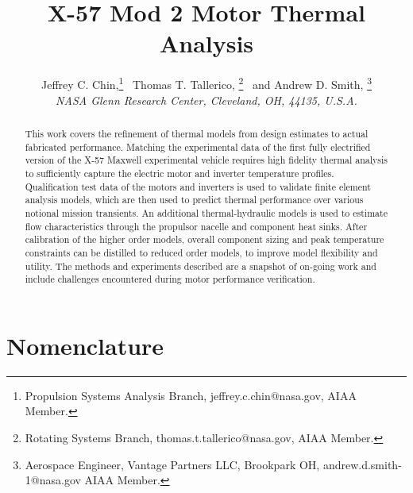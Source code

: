 \documentclass[]{aiaa-tc}%
\title{X-57 Mod 2 Motor Thermal Analysis}
\author{
  Jeffrey C. Chin,\thanks{Propulsion Systems Analysis Branch, jeffrey.c.chin@nasa.gov, AIAA Member.} \
  Thomas T. Tallerico, \thanks{Rotating Systems Branch, thomas.t.tallerico@nasa.gov, AIAA Member.} \
  and Andrew D. Smith, \thanks{Aerospace Engineer, Vantage Partners LLC, Brookpark OH, andrew.d.smith-1@nasa.gov AIAA Member.} \\
  {\normalsize \itshape NASA Glenn Research Center, Cleveland, OH, 44135, U.S.A.} }
\begin{document}
\maketitle

\begin{abstract}

This work covers the refinement of thermal models from design estimates to actual fabricated performance. Matching the experimental data of the first fully electrified version of the X-57 Maxwell experimental vehicle requires high fidelity thermal analysis to sufficiently capture the electric motor and inverter temperature profiles. Qualification test data of the motors and inverters is used to validate finite element analysis models, which are then used to predict thermal performance over various notional mission transients. An additional thermal-hydraulic models is used to estimate flow characteristics through the propulsor nacelle and component heat sinks. After calibration of the higher order models, overall component sizing and peak temperature constraints can be distilled to reduced order models, to improve model flexibility and utility. The methods and experiments described are a snapshot of on-going work and include challenges encountered during motor performance verification.



\end{abstract}


%
\section{Nomenclature}
\end{document}
